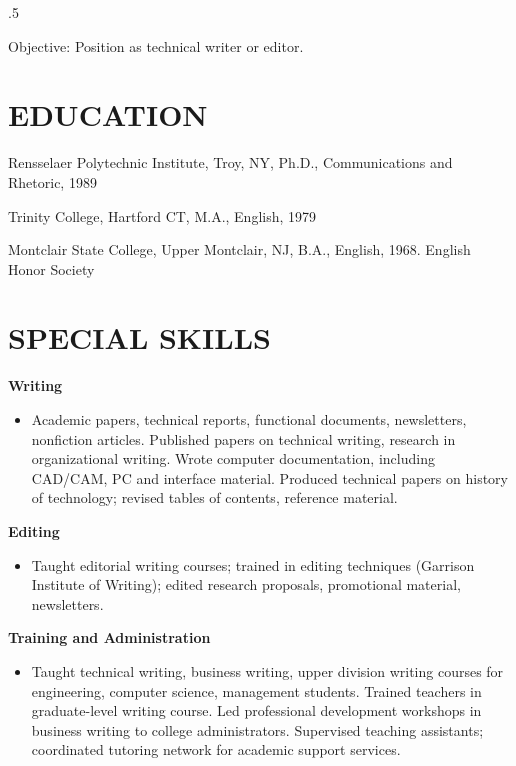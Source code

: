 \documentclass{res}
\begin{document}
 
\thispagestyle{empty} %
\address{222 South Main Street\\
North Adams, MA 01247\\
(413) 555 - 8610}


\begin{resume}
\vspace{0.1in}
\moveleft.5\sectionwidth\centerline{Objective: Position as technical writer or editor.}  

\section{EDUCATION}
\vspace{0.1in} 
 
    Rensselaer Polytechnic Institute, Troy, NY, Ph.D., 
    Communications and Rhetoric, 1989 
 
    Trinity College, Hartford CT, M.A., English, 1979 
 
    Montclair State College, Upper Montclair, NJ, B.A., English, 
    1968. English Honor Society 
 
 
\section{SPECIAL SKILLS} 
\vspace{0.1in}
  {\bf Writing}
    \begin{itemize} %
      \item[] Academic papers, technical reports, functional documents, 
        newsletters, nonfiction articles. Published papers on 
        technical writing, research in organizational writing. 
        Wrote computer documentation, including CAD/CAM, PC and 
        interface material. Produced technical papers on history 
        of technology; revised tables of contents, reference 
        material. 
      \end{itemize}
{\bf Editing} 
       \begin{itemize}
        \item[] Taught editorial writing courses; trained in editing 
        techniques (Garrison Institute of Writing); edited 
        research proposals, promotional material, newsletters.
    \end{itemize}

  {\bf Training and Administration} 
        \begin{itemize}
        \item[] Taught technical writing, business writing, upper 
        division writing courses for engineering, computer 
        science, management students. Trained teachers in 
        graduate-level writing course. Led professional 
        development workshops in business writing to college 
        administrators. Supervised teaching assistants; 
        coordinated tutoring network for academic support 
        services. 
       \end{itemize}


\end{resume}
\end{document}
